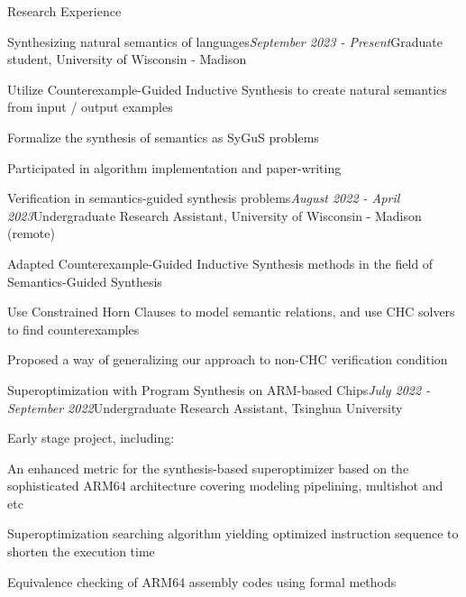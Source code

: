 \documentclass{resume} %
\newcommand{\Apr}{April }
\newcommand{\Jul}{July }
\newcommand{\Aug}{August }
\newcommand{\Sept}{September }
\begin{document}
\begin{rSection}{Research Experience}

\begin{rSubsection}{Synthesizing natural semantics of languages}{\em \Sept 2023 - Present}{Graduate student, \textup{University of Wisconsin - Madison}}{}

\item Utilize Counterexample-Guided Inductive Synthesis to create natural semantics from input / output examples
\item Formalize the synthesis of semantics as SyGuS problems
\item Participated in algorithm implementation and paper-writing

\end{rSubsection}

\begin{rSubsection}{Verification in semantics-guided synthesis problems}{\em \Aug 2022 - \Apr 2023}{Undergraduate Research Assistant, \textup{University of Wisconsin - Madison} (remote)}{}

\item Adapted Counterexample-Guided Inductive Synthesis methods in the field of Semantics-Guided Synthesis
\item Use Constrained Horn Clauses to model semantic relations, and use CHC solvers to find counterexamples
\item Proposed a way of generalizing our approach to non-CHC verification condition

\end{rSubsection}
  
\begin{rSubsection}{Superoptimization with Program Synthesis on ARM-based Chips}{\em \Jul 2022 - \Sept 2022}{Undergraduate Research Assistant, \textup{Tsinghua University}}{}
    
\item Early stage project, including: 
\item An enhanced metric for the synthesis-based superoptimizer based on the sophisticated ARM64 architecture covering modeling pipelining, multishot and etc
\item Superoptimization searching algorithm yielding optimized instruction sequence to shorten the execution time
\item Equivalence checking of ARM64 assembly codes using formal methods

\end{rSubsection}




\end{rSection}
\end{document}

